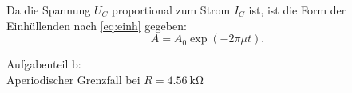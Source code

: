 Da die Spannung $U_C$ proportional zum Strom $I_C$ ist, ist die Form der Einhüllenden nach \autoref{eq:einh} gegeben:
\begin{equation}
  A = A_0 \exp(-2 \pi \mu t).
\end{equation}

















\newpage
Aufgabenteil b:\\
Aperiodischer Grenzfall bei $R = \SI{4.56}{\kilo\ohm}$
